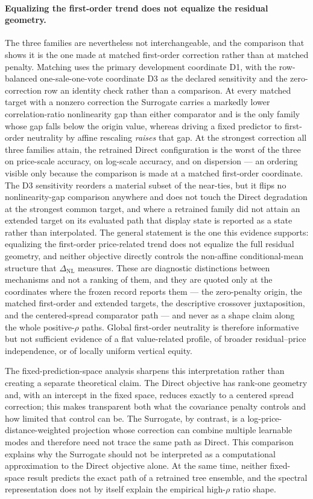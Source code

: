 \documentclass[10pt]{article}
\theoremstyle{definition}
\newcommand{\1}{\mathbf{1}}
\begin{document}
\paragraph{Equalizing the first-order trend does not equalize the residual geometry.}
The three families are nevertheless not interchangeable, and the comparison that shows
it is the one made at matched first-order correction rather than at matched penalty. Matching uses
the primary development coordinate D1, with the row-balanced one-sale-one-vote coordinate D3 as the
declared sensitivity and the zero-correction row an identity check rather than a comparison. At
every matched target with a nonzero correction the Surrogate carries a markedly lower
correlation-ratio nonlinearity gap than either comparator and is the only family whose gap falls
below the origin value, whereas driving a fixed predictor to first-order neutrality by affine
rescaling \emph{raises} that gap. At the strongest correction all three families attain, the
retrained Direct configuration is the worst of the three on price-scale accuracy, on log-scale
accuracy, and on dispersion --- an ordering visible only because the comparison is made at a matched
first-order coordinate. The D3 sensitivity reorders a material subset of the near-ties, but it flips
no nonlinearity-gap comparison anywhere and does not touch the Direct degradation at the strongest
common target, and where a retrained family did not attain an extended target on its evaluated
path that display state is reported as a state rather than interpolated. The general statement is the one this evidence
supports: equalizing the first-order price-related trend does not equalize the full residual
geometry, and neither objective directly controls the non-affine conditional-mean structure that
$\Delta_{\mathrm{NL}}$ measures. These are diagnostic distinctions between mechanisms and not a
ranking of them, and they are quoted only at the coordinates where the frozen record reports them
--- the zero-penalty origin, the matched first-order and extended targets, the descriptive crossover
juxtaposition, and the centered-spread comparator path --- and never as a shape claim along the
whole positive-$\rho$ paths. Global first-order neutrality is therefore informative but not
sufficient evidence of a flat value-related profile, of broader residual--price independence, or of
locally uniform vertical equity.

The fixed-prediction-space analysis sharpens this interpretation rather than creating a separate theoretical claim. The Direct objective has rank-one geometry and, with an intercept in the fixed space, reduces exactly to a centered spread correction; this makes transparent both what the covariance penalty controls and how limited that control can be. The Surrogate, by contrast, is a log-price-distance-weighted projection whose correction can combine multiple learnable modes and therefore need not trace the same path as Direct. This comparison explains why the Surrogate should not be interpreted as a computational approximation to the Direct objective alone. At the same time, neither fixed-space result predicts the exact path of a retrained tree ensemble, and the spectral representation does not by itself explain the empirical high-$\rho$ ratio shape.
\end{document}
